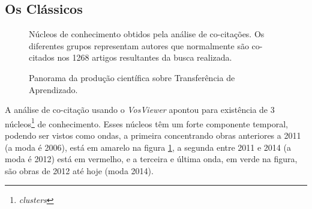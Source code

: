 \documentclass[sigconf]{acmart}
\newcommand{\source}[2]{\raggedleft{}\vspace*{-7mm}\caption*{ \textmd{\scriptsize{Dados: {#1}.\hfill Ferramenta:{#2}}}}}
\begin{document}
  \subsection{Os Clássicos}\label{classicos}
  \begin{figure}[h!]
    \source{Web of Science (março/2019)}{VosViewer\protect{~\cite{VOSviewer}}}
    \caption{Núcleos de conhecimento obtidos pela análise de co-citações. Os diferentes grupos representam autores que normalmente são co-citados nos 1268 artigos resultantes da busca realizada.}
    \label{fig:classicos}
  \end{figure}
  \begin{figure}[htp]
    \centering
    \source{Web of Science (março/2019)}{Excel}
    \caption{Panorama da produção científica sobre Transferência de Aprendizado.} \label{fig:toptop}
  \end{figure}
A análise de co-citação usando o \emph{VosViewer} apontou para existência de 3 núcleos\footnote{\emph{clusters}} de conhecimento. Esses núcleos têm um forte componente temporal, podendo ser vistos como ondas, a primeira concentrando obras anteriores a 2011 (a moda é 2006),  está em amarelo na figura \ref{fig:classicos}, a segunda entre 2011 e 2014 (a moda é 2012) está em vermelho, e a terceira e última onda, em verde na figura, são obras de 2012 até hoje (moda 2014).
\end{document}
